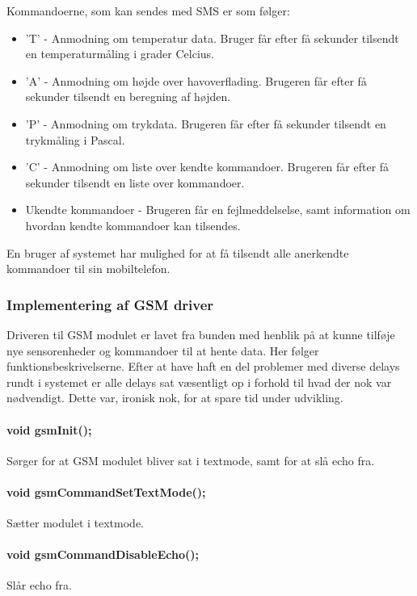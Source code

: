Kommandoerne, som kan sendes med SMS er som følger:

\begin{itemize}
    \item 'T' - Anmodning om temperatur data. Bruger får efter få sekunder tilsendt en temperaturmåling i grader Celcius.
    \item 'A' - Anmodning om højde over havoverflading. Brugeren får efter få sekunder tilsendt en beregning af højden.
    \item 'P' - Anmodning om trykdata. Brugeren får efter få sekunder tilsendt en trykmåling i Pascal.
    \item 'C' - Anmodning om liste over kendte kommandoer. Brugeren får efter få sekunder tilsendt en liste over kommandoer.
    \item Ukendte kommandoer - Brugeren får en fejlmeddelselse, samt information om hvordan kendte kommandoer kan tilsendes.
\end{itemize}

En bruger af systemet har mulighed for at få tilsendt alle anerkendte kommandoer til sin mobiltelefon.

\subsubsection{Implementering af GSM driver}

Driveren til GSM modulet er lavet fra bunden med henblik på at kunne tilføje nye sensorenheder og kommandoer til at hente data. Her følger funktionsbeskrivelserne. Efter at have haft en del problemer med diverse delays rundt i systemet er alle delays sat væsentligt op i forhold til hvad der nok var nødvendigt. Dette var, ironisk nok, for at spare tid under udvikling.

\paragraph{void gsmInit();}
Sørger for at GSM modulet bliver sat i textmode, samt for at slå echo fra.

\paragraph{void gsmCommandSetTextMode();}
Sætter modulet i textmode.

\paragraph{void gsmCommandDisableEcho();}
Slår echo fra.

